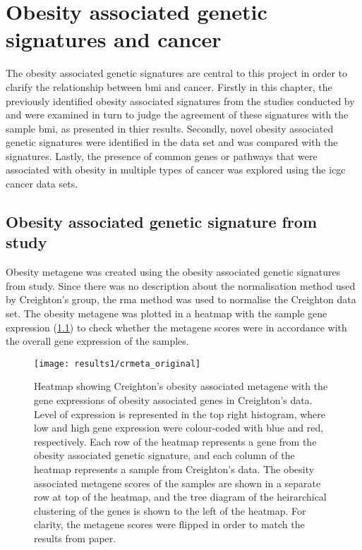 \chapter{Obesity associated genetic signatures and cancer}
\label{cha:obesity_genetic_signatures_and_cancer}

The obesity associated genetic signatures are central to this project in order to clarify the relationship between \gls{bmi} and cancer.
Firstly in this chapter, the previously identified obesity associated signatures from the studies conducted by \citet{Creighton2012} and \citet{Fuentes-Mattei2014} were examined in turn to judge the agreement of these signatures with the sample \gls{bmi}, as presented in thier results.
Secondly, novel obesity associated genetic signatures were identified in the \citet{Creighton2012} data set and was compared with the signatures.
Lastly, the presence of common genes or pathways that were associated with obesity in multiple types of cancer was explored using the \gls{icgc} cancer data sets.

\section{Obesity associated genetic signature from \citet{Creighton2012} study}
\label{sec:creighton_obesity_metagene}

Obesity metagene was created using the obesity associated genetic signatures from \citet{Creighton2012} study.
Since there was no description about the normalisation method used by Creighton's group, the \gls{rma} method was used to  normalise the Creighton data set.
The obesity metagene was plotted in a heatmap with the sample gene expression (\cref{fig:crmetaheat1}) to check whether the metagene scores were in accordance with the overall gene expression of the samples.

\begin{figure}[htb]
	\centering
	\texttt{[image: results1/crmeta\_original]}
	\caption[Heatmap of Creighton's metagene in Creighton's data]{Heatmap showing Creighton's obesity associated metagene with the gene expressions of obesity associated genes in Creighton's data. Level of expression is represented in the top right histogram, where low and high gene expression were colour-coded with blue and red, respectively. Each row of the heatmap represents a gene from the obesity associated genetic signature, and each column of the heatmap represents a sample from Creighton's data. The obesity associated metagene scores of the samples are shown in a separate row at top of the heatmap, and the tree diagram of the heirarchical clustering of the genes is shown to the left of the heatmap. For clarity, the metagene scores were flipped in order to match the results from \citet{Creighton2012} paper.}
	\label{fig:crmetaheat1}
\end{figure}


